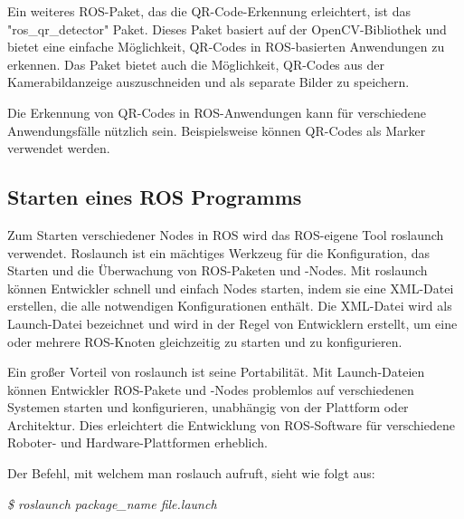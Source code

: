     Ein weiteres \ac{ROS}-Paket, das die QR-Code-Erkennung erleichtert, ist das "ros\_qr\_detector" Paket. Dieses Paket basiert auf der OpenCV-Bibliothek und bietet eine einfache Möglichkeit, QR-Codes in \ac{ROS}-basierten Anwendungen zu erkennen. Das Paket bietet auch die Möglichkeit, QR-Codes aus der Kamerabildanzeige auszuschneiden und als separate Bilder zu speichern.

    Die Erkennung von QR-Codes in \ac{ROS}-Anwendungen kann für verschiedene Anwendungsfälle nützlich sein. Beispielsweise können QR-Codes als Marker verwendet werden.

    \subsection{Starten eines ROS Programms} \label{starten eines ROS Programms:subsection}
    Zum Starten verschiedener Nodes in \ac{ROS} wird das ROS-eigene Tool roslaunch verwendet. Roslaunch ist ein mächtiges Werkzeug für die Konfiguration, das Starten und die Überwachung von ROS-Paketen und -Nodes. Mit roslaunch können Entwickler schnell und einfach Nodes starten, indem sie eine XML-Datei erstellen, die alle notwendigen Konfigurationen enthält. Die XML-Datei wird als Launch-Datei bezeichnet und wird in der Regel von Entwicklern erstellt, um eine oder mehrere ROS-Knoten gleichzeitig zu starten und zu konfigurieren.

    Ein großer Vorteil von roslaunch ist seine Portabilität. Mit Launch-Dateien können Entwickler ROS-Pakete und -Nodes problemlos auf verschiedenen Systemen starten und konfigurieren, unabhängig von der Plattform oder Architektur. Dies erleichtert die Entwicklung von ROS-Software für verschiedene Roboter- und Hardware-Plattformen erheblich. \cite{roslaunch}

    Der Befehl, mit welchem man roslauch aufruft, sieht wie folgt aus:
    
    \textit{\$ roslaunch package\_name file.launch}

